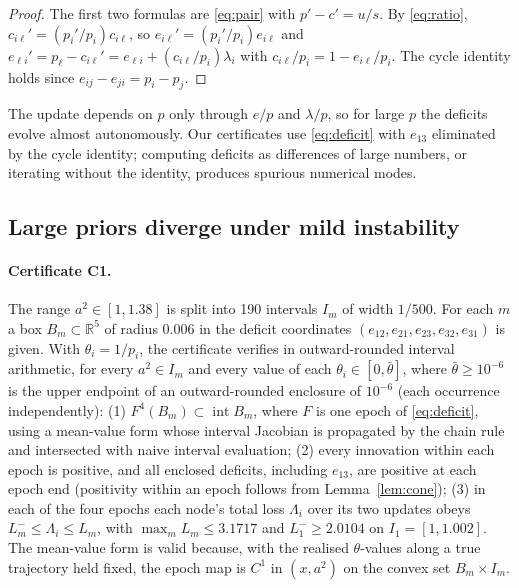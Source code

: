 \documentclass[11pt,a4paper]{article}
\numberwithin{equation}{section}
\theoremstyle{remark}\newtheorem{remark}[theorem]{Remark}
\begin{document}
\begin{proof}
The first two formulas are \eqref{eq:pair} with $p'-c'=u/s$. By \eqref{eq:ratio},
$c_{i\ell}'=(p_i'/p_i)c_{i\ell}$, so $e_{i\ell}'=(p_i'/p_i)e_{i\ell}$ and
$e_{\ell i}'=p_\ell-c_{i\ell}'=e_{\ell i}+(c_{i\ell}/p_i)\lambda_i$ with
$c_{i\ell}/p_i=1-e_{i\ell}/p_i$. The cycle identity holds since $e_{ij}-e_{ji}=p_i-p_j$.
\end{proof}

The update depends on $p$ only through $e/p$ and $\lambda/p$, so for large $p$ the deficits
evolve almost autonomously. Our certificates use \eqref{eq:deficit} with $e_{13}$ eliminated by
the cycle identity; computing deficits as differences of large numbers, or iterating without
the identity, produces spurious numerical modes.

\subsection{Large priors diverge under mild instability}
\paragraph{Certificate C1.} The range $a^2\in[1,1.38]$ is split into 190 intervals $I_m$ of
width $1/500$. For each $m$ a box $B_m\subset\mathbb R^5$ of radius $0.006$ in the deficit
coordinates $(e_{12},e_{21},e_{23},e_{32},e_{31})$ is given. With $\theta_i=1/p_i$, the
certificate verifies in outward-rounded interval arithmetic, for every $a^2\in I_m$ and every
value of each $\theta_i\in[0,\bar\theta]$, where $\bar\theta\ge10^{-6}$ is the upper endpoint of an outward-rounded enclosure of $10^{-6}$ (each occurrence independently): (1) $F^4(B_m)\subset
\operatorname{int}B_m$, where $F$ is one epoch of \eqref{eq:deficit}, using a mean-value form
whose interval Jacobian is propagated by the chain rule and intersected with naive interval
evaluation; (2) every innovation within each epoch is positive, and all enclosed deficits, including $e_{13}$, are positive at each epoch end (positivity within an epoch follows from Lemma~\ref{lem:cone});
(3) in each of the four epochs each node's total loss $\Lambda_i$ over its two updates obeys
$L_m^-\le\Lambda_i\le L_m$, with $\max_mL_m\le3.1717$ and $L_1^-\ge2.0104$ on $I_1=[1,1.002]$.
The mean-value form is valid because, with the realised $\theta$-values along a true
trajectory held fixed, the epoch map is $C^1$ in $(x,a^2)$ on the convex set $B_m\times I_m$.
\end{document}
